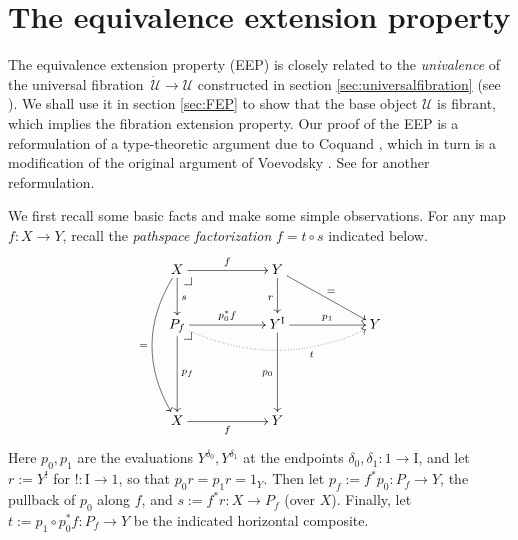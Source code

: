 \documentclass[12pt]{article}
\makeatletter
\newcommand{\ra}{\ensuremath{\rightarrow}}
\newcommand{\I}{\ensuremath{\mathrm{I}}}
\newcommand{\U}{\ensuremath{\mathcal{U}}}
\newcommand{\UU}{\ensuremath{\,\dot{\mathcal{U}}}}
\theoremstyle{remark}
\theoremstyle{definition}
\newcommand{\pbcorner}[1][dr]{\save*!/#1-1.2pc/#1:(-1,1)@^{|-}\restore}
\makeatother
\begin{document}
\section{The equivalence extension property}\label{sec:EEP}

The equivalence extension property (EEP) is closely related to the \emph{univalence} of the universal fibration $\UU\ra\U$ constructed in section \ref{sec:universalfibration} (see \cite{Shu2015}).  We shall use it in section \ref{sec:FEP} to show that the base object $\U$ is fibrant, which implies the fibration extension property.  Our proof of the EEP is a reformulation of a type-theoretic argument due to Coquand \cite{CCHM}, which in turn is a modification of the original argument of Voevodsky \cite{KLV}.  See \cite{sattler} for another reformulation.

We first recall some basic facts and make some simple observations. For any map $f :X\ra Y$, recall the \emph{pathspace factorization} $f = t\circ s$ indicated below.
\begin{equation}\label{diag:pathspace factorization}
\xymatrix{
X \ar@/_1.5pc/[ddd]_= \ar[d]^s \ar[rr]^f \pbcorner && Y \ar[d]_r \ar[rrd]^=\\
P_f  \ar[dd]^{p_f} \ar[rr]^{p_0^*f} \ar@{.>}@/_1.5pc/[rrrr]_<<<<<<<<<<<<<<<t \pbcorner && Y^\I \ar[dd]_{p_0} \ar[rr]^-{p_1} && Y \\
\\
X \ar[rr]_f  &&  Y &
}
\end{equation}
Here $p_0, p_1$ are the evaluations $Y^{\delta_{0}}, Y^{\delta_{1}}$ at the endpoints $\delta_0, \delta_1 : 1\ra\I$, and let $r:= Y^!$ for $! : \I\ra 1$, so that $p_0r = p_1r = 1_Y$.  Then let  $p_f := f^*p_0 : P_f \ra Y$, the pullback of $p_0$ along $f$, and $s:= f^*r : X\ra P_f$ (over $X$).  Finally, let $t:= p_1\circ p_0^*f : P_f \ra Y$ be the indicated horizontal composite. 
\end{document}
